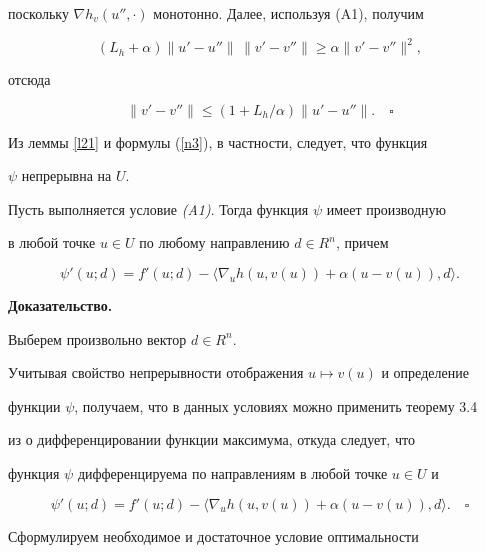 поскольку $\nabla h_v(u'',\cdot)$ монотонно. Далее, используя (A1), получим


$$


(L_h + \alpha) \|u' - u''\|\, \|v' - v''\| \ge \alpha\|v' - v''\|^2,


$$


отсюда


$$


\|v' - v''\| \le (1 +L_h/\alpha) \|u' - u''\|.\quad\square


$$





Из леммы \ref{l21} и формулы (\ref{n3}), в частности, следует, что функция


$\psi$ непрерывна на $U$.





\begin{lems}\label{l22} 


Пусть выполняется условие {\em (A1)}. Тогда функция $\psi$ имеет производную


в любой точке $u \in U$ по любому направлению $d \in R^n$, причем


$$


\psi'(u;d) = f'(u;d) - \langle \nabla_u h(u, v(u)) + \alpha (u-v(u)),d \rangle.


$$


\end{lems}





{\bf Доказательство.} 


Выберем произвольно вектор $d \in R^n$. 


Учитывая свойство непрерывности отображения $u \mapsto v(u)$ и определение 


функции $\psi$, получаем, что в данных условиях можно применить теорему 3.4


из \cite{DR90} о дифференцировании функции максимума, откуда следует, что


функция $\psi$ дифференцируема по направлениям в любой точке $u \in U$ и 


$$


\psi'(u;d) = f'(u;d) - \langle \nabla_u h(u, v(u)) +


\alpha (u-v(u)),d \rangle.\quad\square


$$





Сформулируем необходимое и достаточное условие оптимальности 


